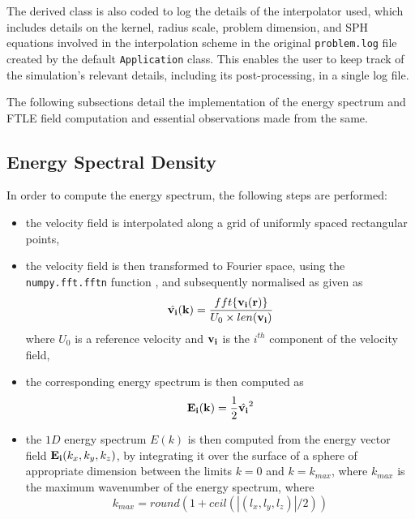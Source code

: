 The derived class is also coded to log the details of the interpolator used, which includes details on the kernel, radius scale, problem dimension, and SPH equations involved in the interpolation scheme in the original \texttt{problem.log} file created by the default \texttt{Application} class. This enables the user to keep track of the simulation's relevant details, including its post-processing, in a single log file.

The following subsections detail the implementation of the energy spectrum and FTLE field computation and essential observations made from the same.


\subsection{Energy Spectral Density}
In order to compute the energy spectrum, the following steps are performed:

\begin{itemize}
    \item the velocity field is interpolated along a grid of uniformly spaced rectangular points,
    \item the velocity field is then transformed to Fourier space, using the \texttt{numpy.fft.fftn} function \parencite{harris2020array}, and subsequently normalised as given as
    \begin{equation}
        \hat{\mathbf{v_i}}(\mathbf{k}) = \frac{ fft\{ \mathbf{v_i}(\mathbf{r}) \} }{U_0 \times len(\mathbf{v_i})}
    \end{equation}
    where $U_0$ is a reference velocity and $\mathbf{v_i}$ is the $i^{th}$ component of the velocity field,
    \item the corresponding energy spectrum is then computed as
    \begin{equation}
        \mathbf{E_i}(\mathbf{k}) = \frac{1}{2} \hat{\mathbf{v_i}}^2
    \end{equation}
    \item the $1D$ energy spectrum $E(k)$ is then computed from the energy vector field $\mathbf{E_i}(k_x, k_y, k_z)$, by integrating it over the surface of a sphere of appropriate dimension between the limits $k=0$ and $k=k_{max}$, where $k_{max}$ is the maximum wavenumber of the energy spectrum, where 
    \begin{equation}
        k_{max} = round(1 + ceil(|(l_x, l_y, l_z)|/2))
    \end{equation}
\end{itemize}


